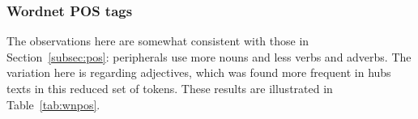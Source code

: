 																																																\subsubsection{Wordnet POS tags}\label{subsec:wnpos}
																																																The observations here are somewhat consistent with those in Section~\ref{subsec:pos}:
																																																peripherals use more nouns and less verbs and adverbs.
																																																The variation here is regarding adjectives, which was found more frequent in hubs texts
																																																in this reduced set of tokens.
																																																These results are illustrated in Table~\ref{tab:wnpos}.
																																																
																																																\FloatBarrier


